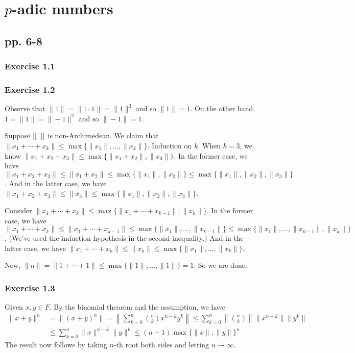 \documentclass[../Koblitz.tex]{subfiles}
\begin{document}
\chapter{\texorpdfstring{$p$}{p}-adic numbers}

\section*{pp. 6-8}

\subsection*{Exercise 1.1}

\subsection*{Exercise 1.2}

Observe that $\|1\|=\|1\cdot1\|=\|1\|^2$ and so $\|1\|=1$. On the other hand, $1=\|1\|=\|-1\|^2$ and so $\|-1\|=1$.

Suppose $\dnr$ is non-Archimedean. We claim that $\|x_1+\cdots+x_k\| \leq \max{\{\|x_1\|,\ldots,\|x_k\|\}}$. Induction on $k$. When $k=3$, we know $\|x_1+x_2+x_3\| \leq \max\{\|x_1+x_2\|,\|x_3\|\}$. In the former case, we have $\|x_1+x_2+x_3\| \leq \|x_1+x_2\| \leq \max\{\|x_1\|,\|x_2\|\} \leq \max\{\|x_1\|,\|x_2\|,\|x_3\|\}$. And in the latter case, we have $\|x_1+x_2+x_3\| \leq \|x_3\| \leq \max\{\|x_1\|,\|x_2\|,\|x_3\|\}$.

Consider $\|x_1+\cdots+x_k\| \leq \max\{\|x_1+\cdots+x_{k-1}\|,\|x_k\|\}$. In the former case, we have $\|x_1+\cdots+x_k\| \leq \|x_1+\cdots+x_{k-1}\| \leq \max\{\|x_1\|,\ldots,\|x_{k-1}\|\} \leq \max\{\|x_1\|,\ldots,\|x_{k-1}\|,\|x_k\|\}$. (We've used the induction hypothesis in the second inequality.) And in the latter case, we have $\|x_1+\cdots+x_k\| \leq \|x_k\| \leq \max\{\|x_1\|,\ldots,\|x_k\|\}$.

Now, $\|n\|=\|1+\cdots+1\| \leq \max\{\|1\|,\ldots,\|1\|\}=1$. So we are done.

\subsection*{Exercise 1.3}

Given $x,y\in F$. By the binomial theorem and the assumption, we have 
\begin{align*}
\|x+y\|^n &= \|(x+y)^n\| = \left\|\sum_{k=0}^n \binom{n}{k}x^{n-k}y^k\right\| \leq \sum_{k=0}^n \left\|\binom{n}{k}\right\|\|x^{n-k}\|\|y^k\| \\
&\leq \sum_{k=0}^n \|x\|^{n-k} \|y\|^k \leq (n+1)\max\{\|x\|,\|y\|\}^n
\end{align*}
The result now follows by taking $n$-th root both sides and letting $n\to\infty$.
\end{document}
